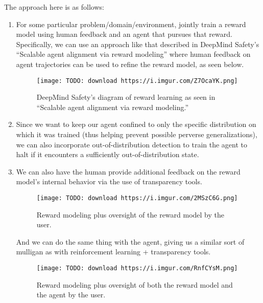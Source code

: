 \documentclass[
  onecolumn,
  natbib,
]{miri-tech-article}
\begin{document}
The approach here is as follows:

\begin{enumerate}
\item For some particular problem/domain/environment, jointly train a reward model using human feedback and an agent that pursues that reward. Specifically, we can use an approach like that described in DeepMind Safety's ``Scalable agent alignment via reward modeling\cite{TODO: cite https://medium.com/@deepmindsafetyresearch/scalable-agent-alignment-via-reward-modeling-bf4ab06dfd84}'' where human feedback on agent trajectories can be used to refine the reward model, as seen below.

\begin{figure}[h!]
  \centering
  \texttt{[image: TODO: download https://i.imgur.com/Z7OcaYK.png]}
  \caption{DeepMind Safety's diagram of reward learning as seen in ``Scalable agent alignment via reward modeling\cite{TODO: cite https://medium.com/@deepmindsafetyresearch/scalable-agent-alignment-via-reward-modeling-bf4ab06dfd84}.''}
\end{figure}

\item Since we want to keep our agent confined to only the specific distribution on which it was trained (thus helping prevent possible perverse generalizations), we can also incorporate out-of-distribution detection\cite{TODO: cite https://ai.googleblog.com/2019/12/improving-out-of-distribution-detection.html} to train the agent to halt if it encounters a sufficiently out-of-distribution state.

\item We can also have the human provide additional feedback on the reward model's internal behavior via the use of transparency tools.

\begin{figure}[h!]
  \centering
  \texttt{[image: TODO: download https://i.imgur.com/2MSzC6G.png]}
  \caption{Reward modeling plus oversight of the reward model by the user.}
\end{figure}

And we can do the same thing with the agent, giving us a similar sort of mulligan as with reinforcement learning + transparency tools.

\begin{figure}[h!]
  \centering
  \texttt{[image: TODO: download https://i.imgur.com/RnfCYsM.png]}
  \caption{Reward modeling plus oversight of both the reward model and the agent by the user.}
\end{figure}
\end{enumerate}
\end{document}
